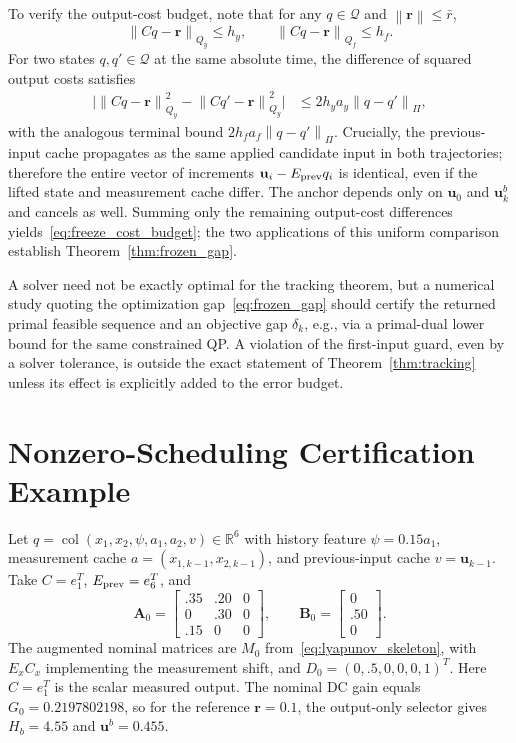 \documentclass[journal]{IEEEtran}
\theoremstyle{plain}
\theoremstyle{definition}
\newcommand{\vr}{\mathbf{r}}
\newcommand{\vu}{\mathbf{u}}
\newcommand{\mA}{\mathbf{A}}
\newcommand{\mB}{\mathbf{B}}
\newcommand{\R}{\mathbb{R}}
\newcommand{\norm}[1]{\left\lVert #1\right\rVert}
\newcommand{\col}{\operatorname{col}}
\begin{document}
To verify the output-cost budget, note that for any $q\in\mathcal Q$ and $\norm{\vr}\le\bar r$,
\begin{equation}
\norm{Cq-\vr}_{Q_y}\le h_y,\qquad
\norm{Cq-\vr}_{Q_f}\le h_f.
\end{equation}
For two states $q,q'\in\mathcal Q$ at the same absolute time, the difference of squared output costs satisfies
\begin{equation}
\begin{split}
\big|\norm{Cq-\vr}_{Q_y}^2-\norm{Cq'-\vr}_{Q_y}^2\big|
&\le2h_ya_y\norm{q-q'}_\Pi,
\end{split}
\label{eq:output_cost_continuity}
\end{equation}
with the analogous terminal bound $2h_fa_f\norm{q-q'}_\Pi$. Crucially, the previous-input cache propagates as the same applied candidate input in both trajectories; therefore the entire vector of increments $\vu_i-E_{\rm prev}q_i$ is identical, even if the lifted state and measurement cache differ. The anchor depends only on $\vu_0$ and $\vu_k^b$ and cancels as well. Summing only the remaining output-cost differences yields~\eqref{eq:freeze_cost_budget}; the two applications of this uniform comparison establish Theorem~\ref{thm:frozen_gap}.

A solver need not be exactly optimal for the tracking theorem, but a numerical study quoting the optimization gap~\eqref{eq:frozen_gap} should certify the returned primal feasible sequence and an objective gap $\delta_k$, e.g., via a primal-dual lower bound for the same constrained QP. A violation of the first-input guard, even by a solver tolerance, is outside the exact statement of Theorem~\ref{thm:tracking} unless its effect is explicitly added to the error budget.
\endgroup

\begingroup\color{blue}
\section{Nonzero-Scheduling Certification Example}
\label{app:certificate}
Let $q=\col(x_1,x_2,\psi,a_1,a_2,v)\in\R^6$ with history feature $\psi=0.15a_1$, measurement cache $a=(x_{1,k-1},x_{2,k-1})$, and previous-input cache $v=\vu_{k-1}$. Take $C=e_1^T$, $E_{\rm prev}=e_6^T$, and
\begin{equation}
\mA_0=\begin{bmatrix}.35&.20&0\\0&.30&0\\ .15&0&0\end{bmatrix},
\qquad \mB_0=\begin{bmatrix}0\\ .50\\0\end{bmatrix}.
\label{eq:example_A0B0}
\end{equation}
The augmented nominal matrices are $M_0$ from~\eqref{eq:lyapunov_skeleton}, with $E_xC_x$ implementing the measurement shift, and $D_0=(0,.5,0,0,0,1)^T$. Here $C=e_1^T$ is the scalar measured output. The nominal DC gain equals $G_0=0.2197802198$, so for the reference $\vr=0.1$, the output-only selector gives $H_b=4.55$ and $\vu^b=0.455$.
\end{document}
